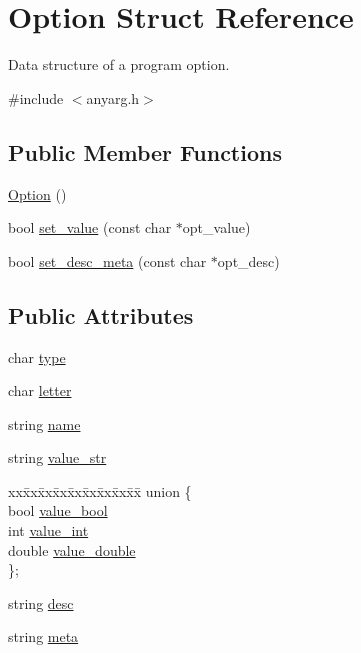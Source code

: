 \hypertarget{struct_option}{\section{Option Struct Reference}
\label{struct_option}
}


Data structure of a program option.  




{\ttfamily \#include $<$anyarg.\-h$>$}

\subsection*{Public Member Functions}
\begin{DoxyCompactItemize}
\item 
\hyperlink{struct_option_af517613005312013c576eb9099a50464}{Option} ()
\item 
bool \hyperlink{struct_option_aacdbd19f75a4b720896e08771866c070}{set\-\_\-value} (const char $\ast$opt\-\_\-value)
\item 
bool \hyperlink{struct_option_a41dfc9bb0d5ce3e4c33039cf56801bf3}{set\-\_\-desc\-\_\-meta} (const char $\ast$opt\-\_\-desc)
\end{DoxyCompactItemize}
\subsection*{Public Attributes}
\begin{DoxyCompactItemize}
\item 
char \hyperlink{struct_option_a08dcf2742c8429087baaacf694089cbe}{type}
\item 
char \hyperlink{struct_option_add92e993875c6dfd378c51418d253e84}{letter}
\item 
string \hyperlink{struct_option_a2a2fd32b8112451bdfd96322c098b6a3}{name}
\item 
string \hyperlink{struct_option_a3f52e913f047b38e95b1490d76eeff00}{value\-\_\-str}
\item 
\begin{tabbing}
xx\=xx\=xx\=xx\=xx\=xx\=xx\=xx\=xx\=\kill
union \{\\
\>bool \hyperlink{struct_option_adfda258d1ec248be6deb65763cceaa07}{value\_bool}\\
\>int \hyperlink{struct_option_a186e1e38cbb463db97e6ac0bd9df2c7f}{value\_int}\\
\>double \hyperlink{struct_option_a9bb84a8ae8e06721694e5b8fb6a35775}{value\_double}\\
\}; \\

\end{tabbing}\item 
string \hyperlink{struct_option_acead0e0fe56632ced43978c9a09a60db}{desc}
\item 
string \hyperlink{struct_option_a565dc0f1d839f046c68c12d1b4a6a5fa}{meta}
\end{DoxyCompactItemize}


